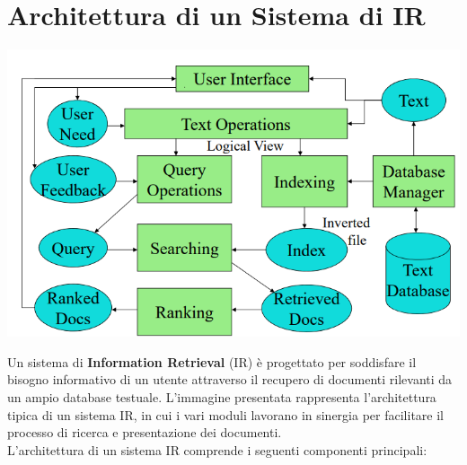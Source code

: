 \documentclass{report}
\begin{document}
	\section{Architettura di un Sistema di IR}
	\begin{center}
		\includegraphics[scale=0.5]{assets/irsystemarch.png}
	\end{center}
	Un sistema di \textbf{Information Retrieval} (IR) è progettato per soddisfare il bisogno informativo di un utente attraverso il recupero di documenti rilevanti da un ampio database testuale. L'immagine presentata rappresenta l'architettura tipica di un sistema IR, in cui i vari moduli lavorano in sinergia per facilitare il processo di ricerca e presentazione dei documenti.
	\vspace{\baselineskip}\\
	L'architettura di un sistema IR comprende i seguenti componenti principali:
\end{document}
